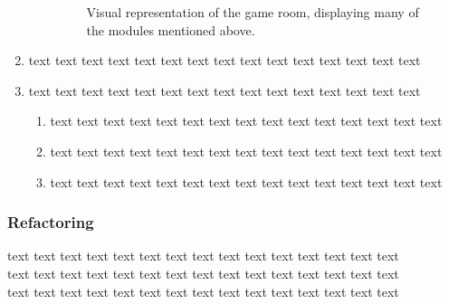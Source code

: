 \documentclass[12pt]{report}
\begin{document}
\begin{enumerate}
\begin{enumerate}
\begin{figure}[h]
\centering
{}
\caption{Visual representation of the game room, displaying many of the modules mentioned above.}
\end{figure}

\end{enumerate}
\item text text text text text text text text text text text text text text text\\
\item text text text text text text text text text text text text text text text\\
\begin{enumerate}
\item text text text text text text text text text text text text text text text\\
\item text text text text text text text text text text text text text text text\\
\item text text text text text text text text text text text text text text text\\
\end{enumerate}
\end{enumerate}
\subsubsection{Refactoring}
text text text text text text text text text text text text text text text\\text text text text text text text text text text text text text text text\\text text text text text text text text text text text text text text text\\
\end{document}
